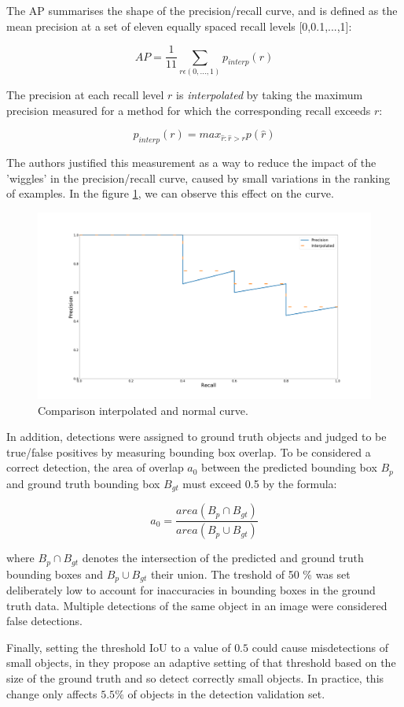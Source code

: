 The AP summarises the shape of the precision/recall curve, and is defined as the mean precision at a set of eleven equally spaced recall levels [0,0.1,...,1]:

$$ AP = \dfrac{1}{11} \sum_{r \epsilon (0,...,1)} p_{interp}(r) $$

The precision at each recall level $r$ is \textit{interpolated} by taking the maximum precision measured for a method for which the corresponding recall exceeds $r$:

$$ p_{interp}(r) = max_{\hat r: \hat r>r} p( \hat r)$$

The authors justified this measurement as a way to reduce the impact of the 'wiggles' in the precision/recall curve, caused by small variations in the ranking of examples. In the figure \ref{diagramaI}, we can observe this effect on the curve.

\begin{figure}[H]
\centering         
\includegraphics[width=0.7\linewidth]{evaluacionObject/interpol.png}
\caption{Comparison interpolated and normal curve.} \label{diagramaI}
\end{figure}


In addition, detections were assigned to ground truth objects and judged to be true/false positives by measuring bounding box overlap. To be considered a correct detection, the area of overlap $a_{0}$ between the predicted bounding box $B_{p}$ and ground truth bounding box $ B_{gt}$ must exceed 0.5 by the formula:


$$ a_{0} = \dfrac{area(B_{p} \cap B_{gt})}{area(B_{p} \cup B_{gt})} $$

where $B_{p} \cap B_{gt}$ denotes the intersection of the predicted and ground truth bounding boxes and $ B_{p} \cup B_{gt} $ their union. The treshold of 50 \%  was set deliberately low to account for inaccuracies in bounding boxes in the ground truth data. Multiple detections of the same object in an image were considered false detections.

Finally, setting the threshold IoU to a value of $0.5$ could cause misdetections of small objects, in \cite{imagenet} they propose an adaptive setting of that threshold based on the size of the ground truth and so detect correctly small objects. In practice, this change only affects $5.5\%$ of objects in the detection validation set.








